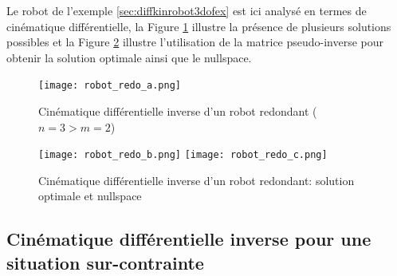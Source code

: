 \begin{example}
Le robot de l'exemple \ref{sec:diffkinrobot3dofex} est ici analysé en termes de cinématique différentielle, la Figure \ref{fig:robot_redo_a} illustre la présence de plusieurs solutions possibles et la Figure \ref{fig:robot_redo_c} illustre l'utilisation de la matrice pseudo-inverse pour obtenir la solution optimale ainsi que le nullspace. 
%
\begin{figure}[H]
	\centering
		\texttt{[image: robot\_redo\_a.png]}
	\caption{Cinématique différentielle inverse d'un robot redondant ($n=3>m=2$)}
	\label{fig:robot_redo_a}
\end{figure}
%
%
\begin{figure}[H]
	\centering
		\texttt{[image: robot\_redo\_b.png]}
		\texttt{[image: robot\_redo\_c.png]}
	\caption{Cinématique différentielle inverse d'un robot redondant: solution optimale et nullspace}
	\label{fig:robot_redo_c}
\end{figure}
\end{example}





\subsection{Cinématique différentielle inverse pour une situation sur-contrainte}
\label{sec:overconstraintrobot}

